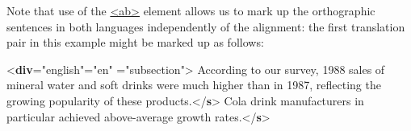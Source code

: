Note that use of the \hyperref[TEI.ab]{<ab>} element allows us to mark up the orthographic sentences in both languages independently of the alignment: the first translation pair in this example might be marked up as follows: \par\bgroup{}\exampleFont \begin{shaded}\noindent\mbox{}{<\textbf{div}\hspace*{1em}{xml:id}="{english}"\hspace*{1em}{xml:lang}="{en}"\mbox{}\newline 
\hspace*{1em}{type}="{subsection}">}\mbox{}\newline 
{}\mbox{}\newline 
\hspace*{1em}According to our survey, 1988 sales of mineral water and soft\mbox{}\newline 
\hspace*{1em}\hspace*{1em}\hspace*{1em}\hspace*{1em} drinks were much higher than in 1987, reflecting the growing popularity\mbox{}\newline 
\hspace*{1em}\hspace*{1em}\hspace*{1em}\hspace*{1em} of these products.{</\textbf{s}>}\mbox{}\newline 
\hspace*{1em}Cola drink manufacturers in particular achieved above-average\mbox{}\newline 
\hspace*{1em}\hspace*{1em}\hspace*{1em}\hspace*{1em} growth rates.{</\textbf{s}>}\mbox{}\newline 

\end{shaded}
